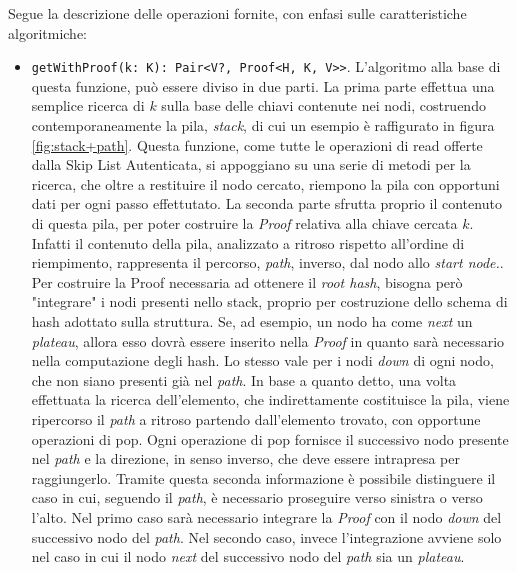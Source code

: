 	Segue la descrizione delle operazioni fornite, con enfasi sulle caratteristiche algoritmiche:
	
	\begin{itemize}
		\item \verb|getWithProof(k: K): Pair<V?, Proof<H, K, V>>|. L'algoritmo alla base di questa funzione, può essere diviso in due parti. La prima parte effettua una semplice ricerca di $ k $ sulla base delle chiavi contenute nei nodi, costruendo contemporaneamente la pila, \textit{stack}, di cui un esempio è raffigurato in figura \ref{fig:stack+path}. Questa funzione, come tutte le operazioni di read offerte dalla Skip List Autenticata, si appoggiano su una serie di metodi per la ricerca, che oltre a restituire il nodo cercato, riempono la pila con opportuni dati per ogni passo effettutato. La seconda parte sfrutta proprio il contenuto di questa pila, per poter costruire la \textit{Proof} relativa alla chiave cercata $ k $. Infatti il contenuto della pila, analizzato a ritroso rispetto all'ordine di riempimento, rappresenta il percorso, \textit{path}, inverso, dal nodo allo \textit{start node.}. Per costruire la Proof necessaria ad ottenere il \textit{root hash}, bisogna però "integrare" i nodi presenti nello stack, proprio per costruzione dello schema di hash adottato sulla struttura. Se, ad esempio, un nodo ha come \textit{next} un \textit{plateau}, allora esso dovrà essere inserito nella \textit{Proof} in quanto sarà necessario nella computazione degli hash. Lo stesso vale per i nodi \textit{down} di ogni nodo, che non siano presenti già nel \textit{path}.
		In base a quanto detto, una volta effettuata la ricerca dell'elemento, che indirettamente costituisce la pila, viene ripercorso il \textit{path} a ritroso partendo dall'elemento trovato, con opportune operazioni di pop. Ogni operazione di pop fornisce il successivo nodo presente nel \textit{path} e la direzione, in senso inverso, che deve essere intrapresa per raggiungerlo. Tramite questa seconda informazione è possibile distinguere il caso in cui, seguendo il \textit{path}, è necessario proseguire verso sinistra o verso l'alto. Nel primo caso sarà necessario integrare la \textit{Proof} con il nodo \textit{down} del successivo nodo del \textit{path}. Nel secondo caso, invece l'integrazione avviene solo nel caso in cui il nodo \textit{next} del successivo nodo del \textit{path} sia un \textit{plateau}.
		

\end{itemize}
